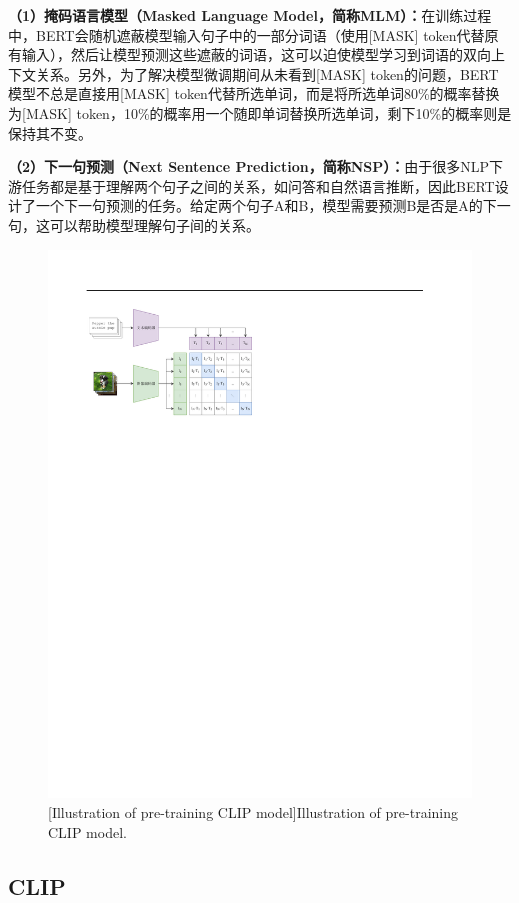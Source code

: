 \noindent \textbf{（1）掩码语言模型（Masked Language Model，简称MLM）：}在训练过程中，BERT会随机遮蔽模型输入句子中的一部分词语（使用[MASK] token代替原有输入），然后让模型预测这些遮蔽的词语，这可以迫使模型学习到词语的双向上下文关系。另外，为了解决模型微调期间从未看到[MASK] token的问题，BERT模型不总是直接用[MASK] token代替所选单词，而是将所选单词80\%的概率替换为[MASK] token，10\%的概率用一个随即单词替换所选单词，剩下10\%的概率则是保持其不变。

\noindent \textbf{（2）下一句预测（Next Sentence Prediction，简称NSP）：}由于很多NLP下游任务都是基于理解两个句子之间的关系，如问答和自然语言推断，因此BERT设计了一个下一句预测的任务。给定两个句子A和B，模型需要预测B是否是A的下一句，这可以帮助模型理解句子间的关系。

\begin{figure}[h!]
  \centering
  \includegraphics[width=0.8\columnwidth]{figures/RelatedWork/CLIP.pdf}
  [Illustration of pre-training CLIP model]{Illustration of pre-training CLIP model.}
  \label{figure2: CLIP}
\end{figure}

\subsection[\hspace{-2pt}CLIP]{{\heiti{} \hspace{-8pt}CLIP}}\label{section2: CLIP}

